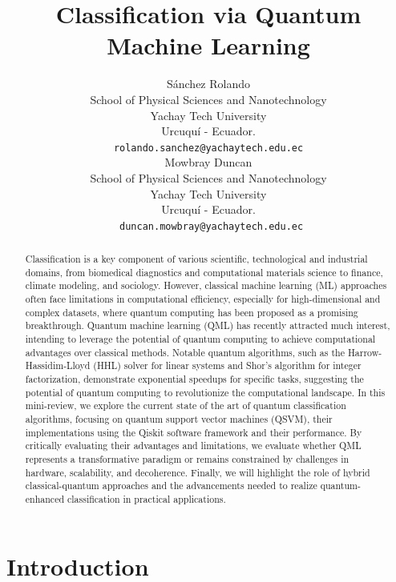 \documentclass{article}
\title{Classification via Quantum Machine Learning} %
\author{
 Sánchez Rolando \\
 School of Physical Sciences and Nanotechnology\\
 Yachay Tech University\\
 Urcuquí - Ecuador. \\
 \texttt{rolando.sanchez@yachaytech.edu.ec} \\
 \And
 Mowbray Duncan \\
 School of Physical Sciences and Nanotechnology\\
 Yachay Tech University\\
 Urcuquí - Ecuador. \\
 \texttt{	duncan.mowbray@yachaytech.edu.ec} \\
}
\begin{document}
\maketitle
\begin{abstract}
Classification is a key component of various scientific, technological and industrial domains, from biomedical diagnostics and computational materials science to finance, climate modeling, and sociology. However, classical machine learning (ML) approaches often face limitations in computational efficiency, especially for high-dimensional and complex datasets, where quantum computing has been proposed as a promising breakthrough. Quantum machine learning (QML) has recently attracted much interest, intending to leverage the potential of quantum computing to achieve computational advantages over classical methods. Notable quantum algorithms, such as the Harrow-Hassidim-Lloyd (HHL) solver for linear systems and Shor's algorithm for integer factorization, demonstrate exponential speedups for specific tasks, suggesting the potential of quantum computing to revolutionize the computational landscape. In this mini-review, we explore the current state of the art of quantum classification algorithms, focusing on quantum support vector machines (QSVM), their implementations using the Qiskit software framework and their performance. By critically evaluating their advantages and limitations, we evaluate whether QML represents a transformative paradigm or remains constrained by challenges in hardware, scalability, and decoherence. Finally, we will highlight the role of hybrid classical-quantum approaches and the advancements needed to realize quantum-enhanced classification in practical applications.
\end{abstract}


\section*{Introduction}
\end{document}
